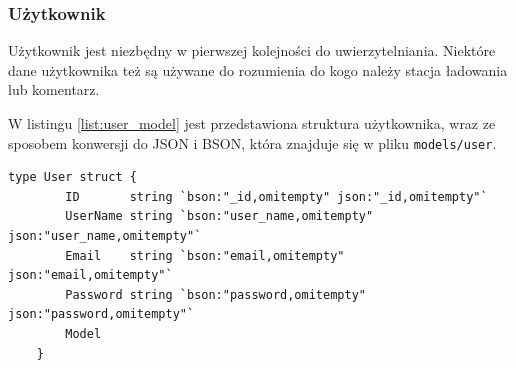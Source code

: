 \subsubsection{Użytkownik}
Użytkownik jest niezbędny w pierwszej kolejności do uwierzytelniania. Niektóre dane użytkownika też są używane do rozumienia do kogo należy stacja ładowania lub komentarz.

W listingu \ref{list:user_model} jest przedstawiona struktura użytkownika, wraz ze sposobem konwersji do JSON i BSON, która znajduje się w pliku \texttt{models/user}.
\begin{lstlisting}[label=list:user_model,caption=Model danych użytkownika,basicstyle=\tiny\ttfamily]
    type User struct {
        ID       string `bson:"_id,omitempty" json:"_id,omitempty"`
        UserName string `bson:"user_name,omitempty" json:"user_name,omitempty"`
        Email    string `bson:"email,omitempty" json:"email,omitempty"`
        Password string `bson:"password,omitempty" json:"password,omitempty"`
        Model
    }
\end{lstlisting}

% 


